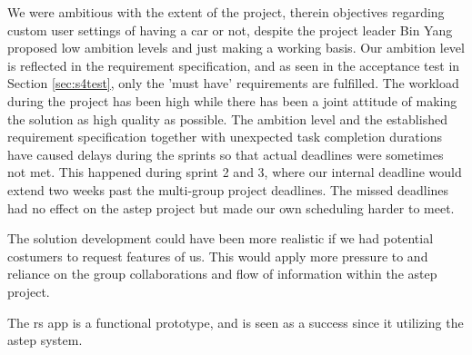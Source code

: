 We were ambitious with the extent of the project, therein objectives regarding custom user settings of having a car or not, despite the project leader Bin Yang proposed low ambition levels and just making a working basis.
Our ambition level is reflected in the requirement specification, and as seen in the acceptance test in Section \ref{sec:s4test}, only the 'must have' requirements are fulfilled.
The workload during the project has been high while there has been a joint attitude of making the solution as high quality as possible.
The ambition level and the established requirement specification together with unexpected task completion durations have caused delays during the sprints so that actual deadlines were sometimes not met.
This happened during sprint 2 and 3, where our internal deadline would extend two weeks past the multi-group project deadlines.
The missed deadlines had no effect on the \gls{astep} project but made our own scheduling harder to meet.

The solution development could have been more realistic if we had potential costumers to request features of us.
This would apply more pressure to and reliance on the group collaborations and flow of information within the \gls{astep} project.

The \gls{rs} app is a functional prototype, and is seen as a success since it utilizing the \gls{astep} system.


